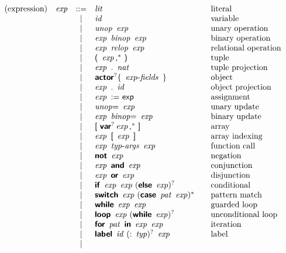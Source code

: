 $$
\begin{array}{@{}lrcl@{\qquad}l}
\text{(expression)} & \x{exp} &::=&
  \x{lit}
    & \text{literal} \\&&|&
  \x{id}
    & \text{variable} \\&&|&
  \x{unop}~\x{exp}
    & \text{unary operation} \\&&|&
  \x{exp}~\x{binop}~\x{exp}
    & \text{binary operation} \\&&|&
  \x{exp}~\x{relop}~\x{exp}
    & \text{relational operation} \\&&|&
  \K(~\x{exp}\K,^\ast~\K)
    & \text{tuple} \\&&|&
  \x{exp}~\K.~\x{nat}
    & \text{tuple projection} \\&&|&
  \KK{actor}^? \K\{~\x{exp-fields}~\K\}
    & \text{object} \\&&|&
  \x{exp}~\K.~\x{id}
    & \text{object projection} \\&&|&
  \x{exp}~\K{:=}~\K{exp}
    & \text{assignment} \\&&|&
  \x{unop}{\!\K=}~\x{exp}
    & \text{unary update} \\&&|&
  \x{exp}~\x{binop}{\!\K=}~\x{exp}
    & \text{binary update} \\&&|&
  \K[~\KK{var}^? \x{exp}\K,^\ast~\K]
    & \text{array} \\&&|&
  \x{exp}~\K[~\x{exp}~\K]
    & \text{array indexing} \\&&|&
  \x{exp}~\x{typ-args}~\x{exp}
    & \text{function call} \\&&|&
  \KK{not}~\x{exp}
    & \text{negation} \\&&|&
  \x{exp}~\KK{and}~\x{exp}
    & \text{conjunction} \\&&|&
  \x{exp}~\KK{or}~\x{exp}
    & \text{disjunction} \\&&|&
  \KK{if}~\x{exp}~\x{exp}~(\KK{else}~\x{exp})^?
    & \text{conditional} \\&&|&
  \KK{switch}~\x{exp}~(\KK{case}~\x{pat}~\x{exp})^\ast
    & \text{pattern match} \\&&|&
  \KK{while}~\x{exp}~\x{exp}
    & \text{guarded loop} \\&&|&
  \KK{loop}~\x{exp}~(\KK{while}~\x{exp})^?
    & \text{unconditional loop} \\&&|&
  \KK{for}~\x{pat}~\KK{in}~\x{exp}~\x{exp}
    & \text{iteration} \\&&|&
  \KK{label}~\x{id}~(\K:~\x{typ})^?~\x{exp}
    & \text{label} \\&&|&

\end{array}$$
